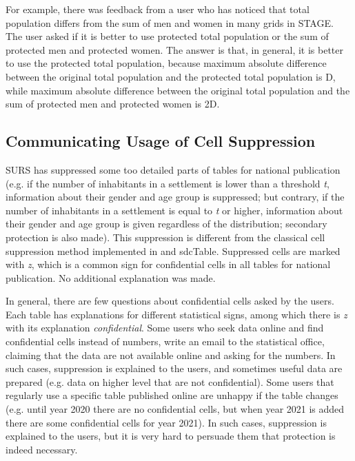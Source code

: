 For example, there was feedback from a user who has noticed that total population differs from the sum of men and women in many grids in STAGE. The user asked if it is better to use protected total population or the sum of protected men and protected women. The answer is that, in general, it is better to use the protected total population, because maximum absolute difference between the original total population and the protected total population is D, while maximum absolute difference between the original total population and the sum of protected men and protected women is 2D.




\subsection{Communicating Usage of Cell Suppression}

SURS has suppressed some too detailed parts of tables for national publication (e.g. if the number of inhabitants in a settlement is lower than a threshold \textit{t}, information about their gender and age group is suppressed; but contrary, if the number of inhabitants in a settlement is equal to \textit{t} or higher, information about their gender and age group is given regardless of the distribution; secondary protection is also made). This suppression is different from the classical cell suppression method implemented in \targus and sdcTable. Suppressed cells are marked with \textit{z}, which is a common sign for confidential cells in all tables for national publication. No additional explanation was made.

In general, there are few questions about confidential cells asked by the users. Each table has explanations for different statistical signs, among which there is \textit{z} with its explanation \textit{confidential}. Some users who seek data online and find confidential cells instead of numbers, write an email to the statistical office, claiming that the data are not available online and asking for the numbers. In such cases, suppression is explained to the users, and sometimes useful data are prepared (e.g. data on higher level that are not confidential). Some users that regularly use a specific table published online are unhappy if the table changes (e.g. until year 2020 there are no confidential cells, but when year 2021 is added there are some confidential cells for year 2021). In such cases, suppression is explained to the users, but it is very hard to persuade them that protection is indeed necessary.


